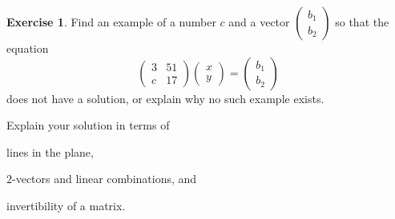 \documentclass[11pt]{amsart}
\theoremstyle{definition}
\newtheorem{exercise}{Exercise}
\begin{document}
\vspace{1cm}

\begin{exercise}
Find an example of a number $c$ and a vector $\left( \begin{smallmatrix} b_1 \\ b_2 \end{smallmatrix}\right)$ so that the equation
\[
\begin{pmatrix} 3 & 51 \\ c & 17 \end{pmatrix} \begin{pmatrix} x \\ y \end{pmatrix} = \begin{pmatrix} b_1 \\ b_2 \end{pmatrix}
\]
does not have a solution, or explain why no such example exists.

Explain your solution in terms of
\begin{compactitem}
\item lines in the plane,
\item $2$-vectors and linear combinations, and
\item invertibility of a matrix.
\end{compactitem}
\end{exercise}
\end{document}
